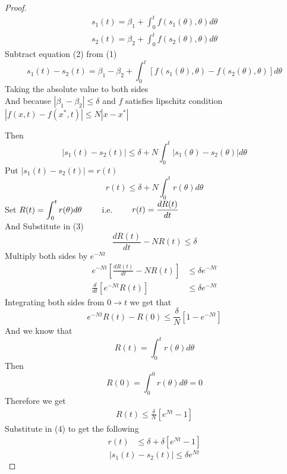 \begin{proof}[\textcolor{theme}{Proof}]
    \begin{align}
        s_1(t) = \beta_1 + \int_{0}^{t}f(s_1(\theta),\theta)d\theta
        \\
        s_2(t) = \beta_2 + \int_{0}^{t}f(s_2(\theta),\theta)d\theta
    \end{align}
    Subtract equation (2) from (1)
    \[
        s_1(t) - s_2(t) = \beta_1 - \beta_2 + \int_{0}^{t} \left[ f(s_1(\theta),\theta) - f(s_2(\theta),\theta)\right]d\theta
    \]
    Taking the absolute value to both sides
    \\
    And because $\left\lvert \beta_1 - \beta_2 \right\rvert \leq \delta $
    and $f$ satisfies lipschitz condition $\left\lvert f(x,t) - f(x^*,t)\right\rvert \leq N\left\lvert x - x^*\right\rvert$
    \par
    Then
    \[
        |s_1(t) - s_2(t)| \leq \delta  + N \int_{0}^{t} \left\lvert s_1(\theta) - s_2(\theta) \right\rvert d\theta
    \]
    Put $|s_1(t) - s_2(t)| = r(t)$
    \begin{equation}
        r(t) \leq \delta  + N \int_{0}^{t} r(\theta) d\theta
    \end{equation}
    Set $\displaystyle R(t) = \int_{0}^{t} r(\theta)d\theta \quad\quad$ i.e. $\quad\quad \displaystyle r(t) = \frac{dR(t)}{dt} $
    \\
    And Substitute in (3)
    \begin{equation}
        \frac{dR(t)}{dt} - NR(t) \leq \delta
    \end{equation}
    Multiply both sides by $e^{-Nt}$
    \begin{align*}
        e^{-Nt}\left[\frac{dR(t)}{dt} - NR(t)\right] & \leq \delta e^{-Nt}
        \\
        \frac{d}{dt}\left[e^{-Nt}R(t)\right]         & \leq \delta e^{-Nt}
    \end{align*}
    Integrating both sides from $0 \to t$ we get that
    \[
        e^{-Nt}R(t) - R(0) \leq \frac{\delta}{N}\left[1-e^{-Nt}\right]
    \]
    And we know that
    \[
        R(t) = \int_{0}^{t} r(\theta)d\theta
    \]
    Then
    \[
        R(0) = \int_{0}^{0} r(\theta)d\theta = 0
    \]
    Therefore we get
    \begin{align*}
        R(t) \leq \frac{\delta}{N}\left[e^{Nt}-1\right]
    \end{align*}
    Substitute in (4) to get the following
    \begin{align*}
        r(t) & \leq \delta + \delta\left[e^{Nt}-1\right]
    \end{align*}
    \begin{equation*}
        |s_1(t) - s_2(t)| \leq \delta e^{Nt}
    \end{equation*}
\end{proof}

